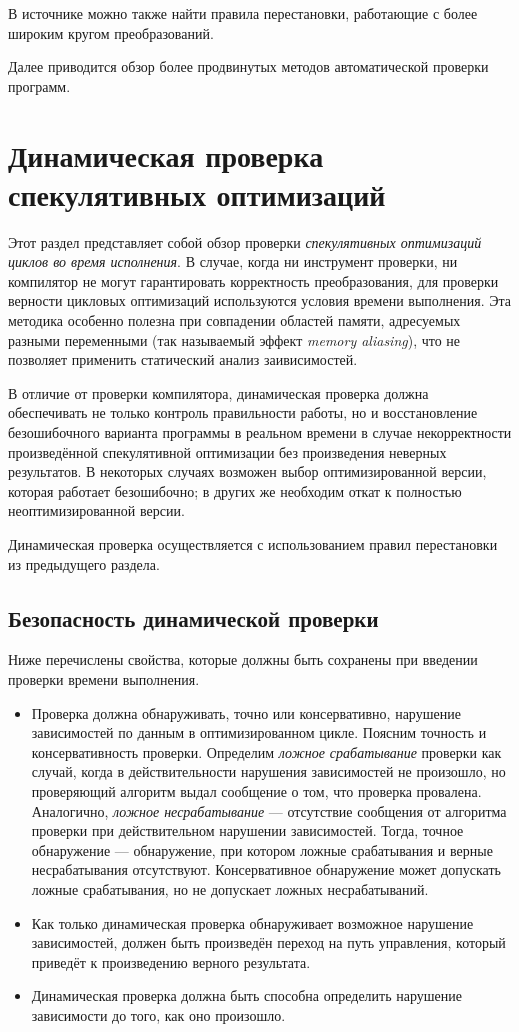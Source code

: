 В источнике \cite{ZPL00} можно также найти правила перестановки, работающие с более широким кругом преобразований.

Далее приводится обзор более продвинутых методов автоматической проверки программ.

\section{Динамическая проверка спекулятивных оптимизаций}

Этот раздел представляет собой обзор проверки \emph{спекулятивных оптимизаций циклов во время исполнения}. В случае, когда ни инструмент проверки, ни компилятор не могут гарантировать корректность преобразования, для проверки верности цикловых оптимизаций используются условия времени выполнения. Эта методика особенно полезна при совпадении областей памяти, адресуемых разными переменными (так называемый эффект \emph{memory aliasing}), что не позволяет применить статический анализ заивисимостей.

В отличие от проверки компилятора, динамическая проверка должна обеспечивать не только контроль правильности работы, но и восстановление безошибочного варианта программы в реальном времени в случае некорректности произведённой спекулятивной оптимизации без произведения неверных результатов. В некоторых случаях возможен выбор оптимизированной версии, которая работает безошибочно; в других же необходим откат к полностью неоптимизированной версии.

Динамическая проверка осуществляется с использованием правил перестановки из предыдущего раздела.

\subsection{Безопасность динамической проверки}

Ниже перечислены свойства, которые должны быть сохранены при введении проверки времени выполнения.

\begin{itemize}
	\item Проверка должна обнаруживать, точно или консервативно, нарушение зависимостей по данным в оптимизированном цикле. Поясним точность и консервативность проверки. Определим \emph{ложное  срабатывание} проверки как случай, когда в действительности нарушения зависимостей не произошло, но проверяющий алгоритм выдал сообщение о том, что проверка провалена. Аналогично, \emph{ложное  несрабатывание} --- отсутствие сообщения от алгоритма проверки при действительном нарушении зависимостей. Тогда, точное обнаружение --- обнаружение, при котором  ложные срабатывания и верные несрабатывания отсутствуют. Консервативное обнаружение может допускать ложные  срабатывания, но не допускает ложных несрабатываний.
	\item Как только динамическая проверка обнаруживает возможное нарушение зависимостей, должен быть произведён переход на путь управления, который приведёт к произведению верного результата.
	\item Динамическая проверка должна быть способна определить нарушение зависимости до того, как оно произошло.
\end{itemize}

